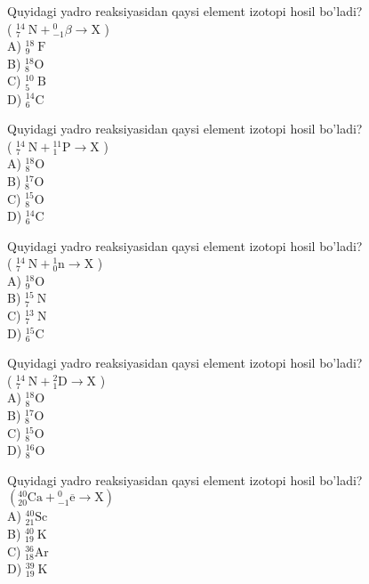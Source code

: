   \item Quyidagi yadro reaksiyasidan qaysi element izotopi hosil bo'ladi?\\
( ${ }_{7}^{14} \mathrm{~N}+{ }_{-1}^{0} \beta \rightarrow \mathrm{X}$ )\\
A) ${ }_{9}^{18} \mathrm{~F}$\\
B) ${ }_{8}^{18} \mathrm{O}$\\
C) ${ }_{5}^{10} \mathrm{~B}$\\
D) ${ }_{6}^{14} \mathrm{C}$
  \item Quyidagi yadro reaksiyasidan qaysi element izotopi hosil bo'ladi?\\
( ${ }_{7}^{14} \mathrm{~N}+{ }_{1}^{11} \mathrm{P} \rightarrow \mathrm{X}$ )\\
A) ${ }_{8}^{18} \mathrm{O}$\\
B) ${ }_{8}^{17} \mathrm{O}$\\
C) ${ }_{8}^{15} \mathrm{O}$\\
D) ${ }_{6}^{14} \mathrm{C}$
  \item Quyidagi yadro reaksiyasidan qaysi element izotopi hosil bo'ladi?\\
( ${ }_{7}^{14} \mathrm{~N}+{ }_{0}^{1} \mathrm{n} \rightarrow \mathrm{X}$ )\\
A) ${ }_{9}^{18} \mathrm{O}$\\
B) ${ }_{7}^{15} \mathrm{~N}$\\
C) ${ }_{7}^{13} \mathrm{~N}$\\
D) ${ }_{6}^{15} \mathrm{C}$
  \item Quyidagi yadro reaksiyasidan qaysi element izotopi hosil bo'ladi?\\
( ${ }_{7}^{14} \mathrm{~N}+{ }_{1}^{2} \mathrm{D} \rightarrow \mathrm{X}$ )\\
A) ${ }_{8}^{18} \mathrm{O}$\\
B) ${ }_{8}^{17} \mathrm{O}$\\
C) ${ }_{8}^{15} \mathrm{O}$\\
D) ${ }_{8}^{16} \mathrm{O}$
  \item Quyidagi yadro reaksiyasidan qaysi element izotopi hosil bo'ladi?\\
$\left({ }_{20}^{40} \mathrm{Ca}+{ }_{-1}^{0} \overline{\mathrm{e}} \rightarrow \mathrm{X}\right)$\\
A) ${ }_{21}^{40} \mathrm{Sc}$\\
B) ${ }_{19}^{40} \mathrm{~K}$\\
C) ${ }_{18}^{36} \mathrm{Ar}$\\
D) ${ }_{19}^{39} \mathrm{~K}$
